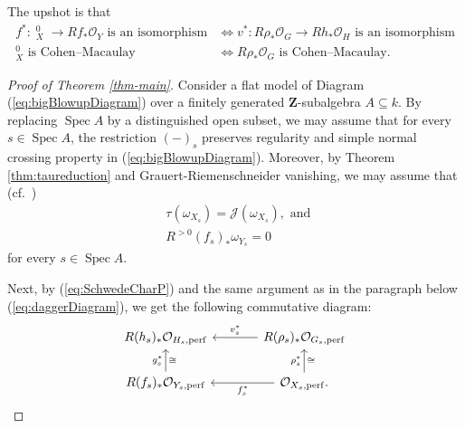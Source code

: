 \documentclass[letterpaper,11pt]{amsart}
\DeclareMathOperator{\DDB}{\underline{\Omega}}
\theoremstyle{plain}
\theoremstyle{definition}
\theoremstyle{remark}
\def\Z{{\mathbf Z}}
\def\cJ{\mathcal{J}}
\def\cO{\mathcal{O}}
\DeclareMathOperator{\Spec} {Spec}
\begin{document}
The upshot is that
\begin{align} \label{eq:equivOfDagger1}
f^* \colon \DDB^0_X \to Rf_*\cO_Y \text{ is an isomorphism} \! &\iff \! v^* \colon R\rho_*\cO_G \to Rh_*\cO_H \text{ is an isomorphism} \\ \label{eq:equivOfDagger2}
\DDB^0_X \text{ is Cohen--Macaulay} \! &\iff \! R\rho_*\cO_G \text{ is Cohen--Macaulay}.
\end{align}

\begin{proof}[Proof of Theorem \ref{thm-main}]
Consider a flat model of Diagram (\ref{eq:bigBlowupDiagram}) over a finitely generated $\Z$-subalgebra $A \subseteq k$. By replacing $\Spec A$ by a distinguished open subset, we may assume that for every $s \in \Spec A$, the restriction $(-)_s$ preserves regularity and simple normal crossing property in (\ref{eq:bigBlowupDiagram}). Moreover, by Theorem \ref{thm:taureduction} and Grauert-Riemenschneider vanishing, we may assume that (cf.\ \cite[Lemma 2.3]{kawakami2026higherfrationalsingularities})
\begin{align} \label{eq:tauJEqualInProof}
&\tau(\omega_{X_s}) = \cJ(\omega_{X_s}), \text{ and } \\
&R^{>0}(f_s)_*\omega_{Y_s} = 0 \nonumber
\end{align}
for every $s \in \Spec A$.

Next, by (\ref{eq:SchwedeCharP}) and the same argument as in the paragraph below (\ref{eq:daggerDiagram}), we get the following commutative diagram:
\begin{equation} \label{eq:daggerDiagramPerf}
\begin{tikzcd}[column sep = large]
R(h_s)_*\cO_{H_s, {\rm perf}} & \ar{l}[swap]{v_s^*} R(\rho_s)_*\cO_{G_s, {\rm perf}} \\
R(f_s)_* \cO_{Y_s, {\rm perf}} \ar{u}{g_s^*}[swap]{\cong} & \ar{l}{f_s^*} \cO_{X_s, {\rm perf}}.  \ar{u}{\rho_s^*}[swap]{\cong}
\end{tikzcd}
\end{equation}


\end{proof}
\end{document}
